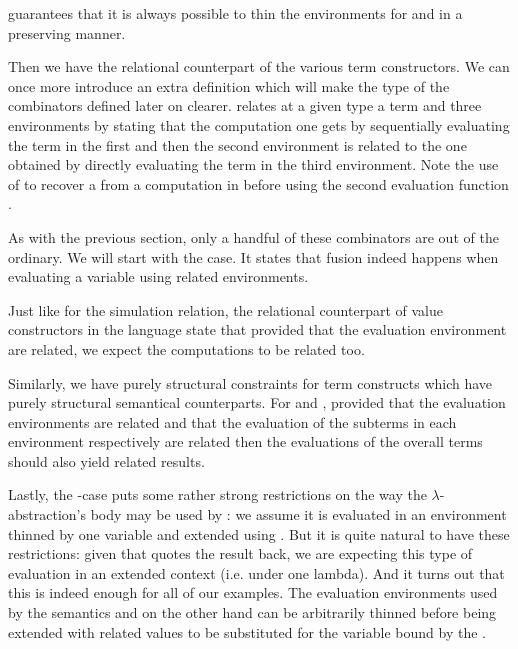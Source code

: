  guarantees that it is always possible to thin the environments
for  and  in a  preserving manner.


Then we have the relational counterpart of the various term constructors. We can once
more introduce an extra definition  which will make the type of the combinators
defined later on clearer.  relates at a given type a term and three environments
by stating that the computation one gets by sequentially evaluating the term in the first
and then the second environment is related to the one obtained by directly evaluating
the term in the third environment. Note the use of  to recover a 
from a computation in  before using the second evaluation function .


As with the previous section, only a handful of these combinators are out
of the ordinary. We will start with the  case. It states that
fusion indeed happens when evaluating a variable using related environments.


Just like for the simulation relation, the relational counterpart of value constructors
in the language state that provided that the evaluation environment are related,
we expect the computations to be related too.


Similarly, we have purely structural constraints for term constructs which have purely
structural semantical counterparts. For  and , provided that the
evaluation environments are related and that the evaluation of the subterms in each
environment respectively are related then the evaluations of the overall terms should
also yield related results.


Lastly, the -case puts some rather strong restrictions on the way the $λ$-abstraction's
body may be used by : we assume it is evaluated in an environment thinned by one variable
and extended using . But it is quite natural to have these restrictions: given that
 quotes the result back, we are expecting this type of evaluation in an extended
context (i.e. under one lambda). And it turns out that this is indeed enough for all of our examples.
The evaluation environments used by the semantics  and  on the other hand can
be arbitrarily thinned before being extended with related values to be substituted for the
variable bound by the .

